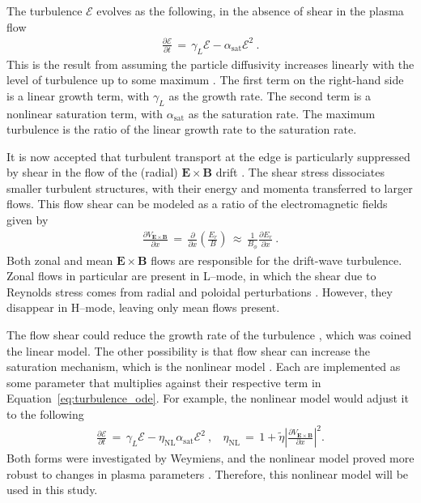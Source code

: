 The turbulence $\mathcal{E}$ evolves as the following, in the absence of shear in the plasma flow
\begin{align} %
	\frac{\partial\mathcal{E}}{\partial t} \,=\, \gamma_L\mathcal{E} - \alpha_\text{sat}\mathcal{E}^2~.
	\label{eq:turbulence_ode}
\end{align}
This is the result from assuming the particle diffusivity increases linearly with the level of turbulence up to some maximum \cite{diamond_dynamics_1995}.
The first term on the right-hand side is a linear growth term, with $\gamma_L$ as the growth rate.
The second term is a nonlinear saturation term, with $\alpha_\text{sat}$ as the saturation rate.
The maximum turbulence is the ratio of the linear growth rate to the saturation rate.

It is now accepted that turbulent transport at the edge is particularly suppressed by shear in the flow of the (radial) $\mathbf{E}\times\mathbf{B}$ drift \cite{terry_suppression_2000}.
The shear stress dissociates smaller turbulent structures, with their energy and momenta transferred to larger flows.
This flow shear can be modeled as a ratio of the electromagnetic fields given by \cite{staps_backstepping_2017}
\begin{align} %
	\frac{\partial V_{\mathbf{E}\times\mathbf{B}}}{\partial x} \,=\, \frac{\partial}{\partial x}
			\left(\frac{E_r}{B}\right) \,\approx\, \frac{1}{B_\phi} \frac{\partial E_r}{\partial x}~.
	\label{eq:velocity_shear}
\end{align}
Both zonal and mean $\mathbf{E}\times\mathbf{B}$ flows are responsible for the drift-wave turbulence.
Zonal flows in particular are present in L--mode, in which the shear due to Reynolds stress comes from radial and poloidal perturbations \cite{diamond_zonal_2005}.
However, they disappear in H--mode, leaving only mean flows present.

The flow shear could reduce the growth rate of the turbulence \cite{diamond_self-regulating_1994}, which was coined the linear model.
The other possibility is that flow shear can increase the saturation mechanism, which is the nonlinear model \cite{hahm_rotation_1994}.
Each are implemented as some parameter that multiplies against their respective term in Equation~\ref{eq:turbulence_ode}.
For example, the nonlinear model would adjust it to the following
\begin{align} %
	\frac{\partial\mathcal{E}}{\partial t} \,=\, \gamma_L\mathcal{E} -
		\eta_\text{NL}\alpha_\text{sat}\mathcal{E}^2~, ~~~~ \eta_\text{NL} \,=\,
		1 + \tilde{\eta} \left|\frac{\partial V_{\mathbf{E}\times\mathbf{B}}}{\partial x}\right|^2.
	\label{eq:nonlinear_turbulence_ode}
\end{align}
Both forms were investigated by Weymiens, and the nonlinear model proved more robust to changes in plasma parameters \cite{weymiens_bifurcation_2014}.
Therefore, this nonlinear model will be used in this study.

